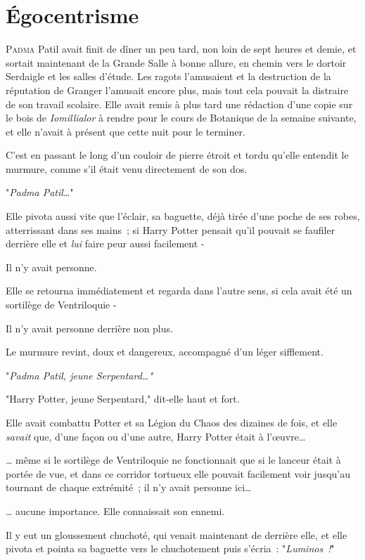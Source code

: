 \chapter{Égocentrisme}

\lettrine{P}{adma} Patil avait finit de dîner un peu tard, non loin de sept heures et demie, et sortait maintenant de la Grande Salle à bonne allure, en chemin vers le dortoir Serdaigle et les salles d'étude. Les ragots l'amusaient et la destruction de la réputation de Granger l'amusait encore plus, mais tout cela pouvait la distraire de son travail scolaire. Elle avait remis à plus tard une rédaction d'une copie sur le bois de \emph{Iomillialor} à rendre pour le cours de Botanique de la semaine suivante, et elle n'avait à présent que cette nuit pour le terminer.

C'est en passant le long d'un couloir de pierre étroit et tordu qu'elle entendit le murmure, comme s'il était venu directement de son dos.

"\emph{Padma Patil…}"

Elle pivota aussi vite que l'éclair, sa baguette, déjà tirée d'une poche de ses robes, atterrissant dans ses mains~; si Harry Potter pensait qu'il pouvait se faufiler derrière elle et \emph{lui} faire peur aussi facilement -

Il n'y avait personne.

Elle se retourna immédiatement et regarda dans l'autre sens, si cela avait été un sortilège de Ventriloquie -

Il n'y avait personne derrière non plus.

Le murmure revint, doux et dangereux, accompagné d'un léger sifflement.

"\emph{Padma Patil, jeune Serpentard…"}

"Harry Potter, jeune Serpentard," dit-elle haut et fort.

Elle avait combattu Potter et sa Légion du Chaos des dizaines de fois, et elle \emph{savait} que, d'une façon ou d'une autre, Harry Potter était à l'œuvre…

… même si le sortilège de Ventriloquie ne fonctionnait que si le lanceur était à portée de vue, et dans ce corridor tortueux elle pouvait facilement voir jusqu'au tournant de chaque extrémité~; il n'y avait personne ici…

… aucune importance. Elle connaissait son ennemi.

Il y eut un gloussement chuchoté, qui venait maintenant de derrière elle, et elle pivota et pointa sa baguette vers le chuchotement puis s'écria~: "\emph{Luminos~!}"

